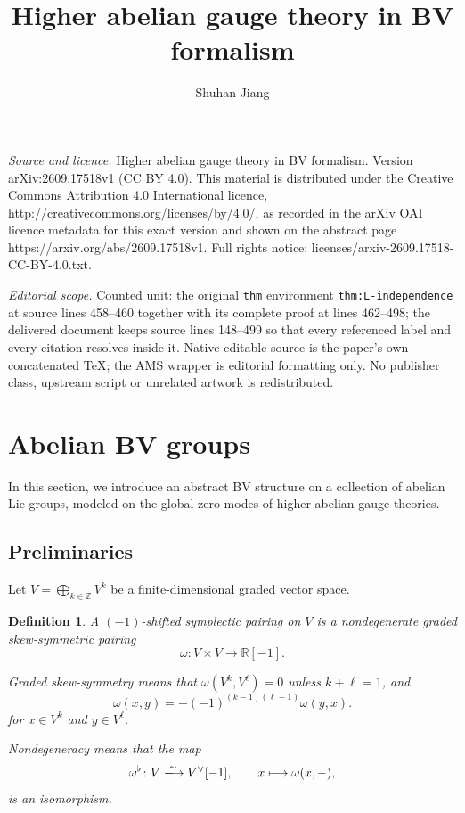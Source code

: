 \documentclass[10pt,a4paper]{amsart}
\numberwithin{table}{section}
\numberwithin{equation}{section}
\newtheorem{defn}{Definition}[section]
\newcommand{\R}{\mathbb{R}}
\newcommand{\Z}{\mathbb{Z}}
\begin{document}
\title[Higher abelian gauge theory in BV formalism]{Higher abelian gauge theory in BV formalism}
\author{Shuhan Jiang}
\date{}
\maketitle
\noindent\emph{Source and licence.} Higher abelian gauge theory in BV formalism. Version arXiv:2609.17518v1 (CC BY 4.0). This material is distributed under the Creative Commons Attribution 4.0 International licence, http://creativecommons.org/licenses/by/4.0/, as recorded in the arXiv OAI licence metadata for this exact version and shown on the abstract page https://arxiv.org/abs/2609.17518v1. Full rights notice: licenses/arxiv-2609.17518-CC-BY-4.0.txt.\par\smallskip
\noindent\textit{Editorial scope.} Counted unit: the original \texttt{thm} environment \texttt{thm:L-independence} at source lines 458--460 together with its complete proof at lines 462--498; the delivered document keeps source lines 148--499 so that every referenced label and every citation resolves inside it. Native editable source is the paper's own concatenated TeX; the AMS wrapper is editorial formatting only. No publisher class, upstream script or unrelated artwork is redistributed.
\section{Abelian BV groups}

In this section, we introduce an abstract BV structure on a collection of abelian Lie groups, modeled on the global zero modes of higher abelian gauge theories.

\subsection{Preliminaries}

Let $V = \bigoplus_{k\in \Z} V^k$ be a finite-dimensional graded vector space.

\begin{defn}
	A \emph{$(-1)$-shifted symplectic pairing} on $V$ is a nondegenerate graded skew-symmetric pairing
	\[
	\omega \colon V \times V \longrightarrow \R[-1].
	\]
	
	Graded skew-symmetry means that $\omega(V^k,V^\ell)=0$ unless $k+\ell=1$, and
	\[
	\omega(x,y)=-(-1)^{(k-1)(\ell-1)}\omega(y,x).
	\]
	for $x \in V^k$ and $y \in V^\ell$. 
	
	Nondegeneracy means that the map
	\[
	\omega^\flat \colon V \xlongrightarrow{\sim} V^\vee[-1],
	\qquad x\longmapsto\omega(x,-),
	\]
	is an isomorphism.
\end{defn}
\end{document}
